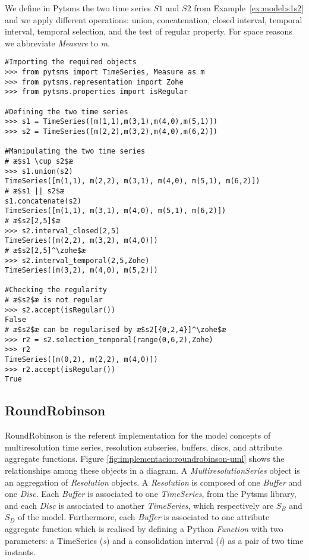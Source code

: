\begin{example}
  We define in Pytsms the two time series $S1$ and $S2$ from
  Example~\ref{ex:model:s1s2} and we apply different operations:
  union, concatenation, closed interval, \zohe{} temporal interval,
  \zohe{} temporal selection, and the test of regular property. For
  space reasons we abbreviate \emph{Measure} to \emph{m}.
\begin{lstlisting}[style=py]
#Importing the required objects
>>> from pytsms import TimeSeries, Measure as m
>>> from pytsms.representation import Zohe
>>> from pytsms.properties import isRegular

#Defining the two time series
>>> s1 = TimeSeries([m(1,1),m(3,1),m(4,0),m(5,1)])
>>> s2 = TimeSeries([m(2,2),m(3,2),m(4,0),m(6,2)])

#Manipulating the two time series
# æ$s1 \cup s2$æ
>>> s1.union(s2)
TimeSeries([m(1,1), m(2,2), m(3,1), m(4,0), m(5,1), m(6,2)])
# æ$s1 || s2$æ
s1.concatenate(s2) 
TimeSeries([m(1,1), m(3,1), m(4,0), m(5,1), m(6,2)])
# æ$s2[2,5]$æ
>>> s2.interval_closed(2,5)
TimeSeries([m(2,2), m(3,2), m(4,0)])
# æ$s2[2,5]^\zohe$æ
>>> s2.interval_temporal(2,5,Zohe)
TimeSeries([m(3,2), m(4,0), m(5,2)])

#Checking the regularity
# æ$s2$æ is not regular
>>> s2.accept(isRegular())
False
# æ$s2$æ can be regularised by æ$s2[{0,2,4}]^\zohe$æ
>>> r2 = s2.selection_temporal(range(0,6,2),Zohe)
>>> r2
TimeSeries([m(0,2), m(2,2), m(4,0)])
>>> r2.accept(isRegular())
True
\end{lstlisting}
\end{example}





\subsection{RoundRobinson}


RoundRobinson is the referent implementation for the model concepts of
multiresolution time series, resolution subseries, buffers, discs, and
attribute aggregate functions. Figure
\ref{fig:implementacio:roundrobinson-uml} shows the relationships
among these objects in a  diagram. A \emph{MultiresolutionSeries}
object is an aggregation of \emph{Resolution} objects. A
\emph{Resolution} is composed of one \emph{Buffer} and one
\emph{Disc}. Each \emph{Buffer} is associated to one \emph{TimeSeries}, from the
Pytsms library, and each \emph{Disc} is associated to another \emph{TimeSeries},
which respectively are $S_B$ and $S_D$ of the 
model. Furthermore, each \emph{Buffer} is associated to one attribute
aggregate function which is realised by defining a Python
\emph{Function} with two parameters: a TimeSeries (\emph{s}) and a
consolidation interval (\emph{i}) as a pair of two time instants.




